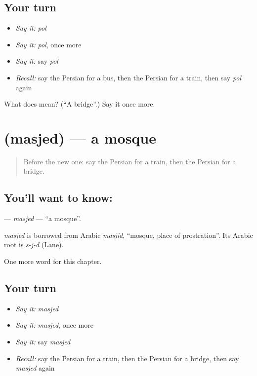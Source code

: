 \subsection*{Your turn}
\begin{itemize}
\raggedright
  \item \emph{Say it:} \emph{pol}
  \item \emph{Say it:} \emph{pol}, once more
  \item \emph{Say it:} say \emph{pol}
  \item \emph{Recall:} say the Persian for a bus, then the Persian for a train, then say \emph{pol} again
\end{itemize}

\begin{tcolorbox}[breakable,colback=teal!4,colframe=teal!35!black,title={Before you move on}]
What does  mean? (\textquotedblleft{}A bridge\textquotedblright{}.) Say it once more.
\end{tcolorbox}
\section[\texorpdfstring{\fa{مسجد} (masjed)}{مسجد (masjed)}]{ (masjed) — a mosque}

\label{lesson:FA-C71-masjed}



\begin{quote}
Before the new one: say the Persian for a train, then the Persian for a bridge.
\end{quote}

\subsection*{You'll want to know: }
\textbf{} — \emph{masjed} — \textquotedblleft{}a mosque\textquotedblright{}.

\begin{cousinweb}
\emph{masjed} is borrowed from Arabic \emph{masjid}, \textquotedblleft{}mosque, place of prostration\textquotedblright{}. Its Arabic root is \emph{s-j-d} (Lane).
\end{cousinweb}

\begin{grammarlens}[title={What you've built}]
One more word for this chapter.
\end{grammarlens}

\subsection*{Your turn}
\begin{itemize}
\raggedright
  \item \emph{Say it:} \emph{masjed}
  \item \emph{Say it:} \emph{masjed}, once more
  \item \emph{Say it:} say \emph{masjed}
  \item \emph{Recall:} say the Persian for a train, then the Persian for a bridge, then say \emph{masjed} again
\end{itemize}

